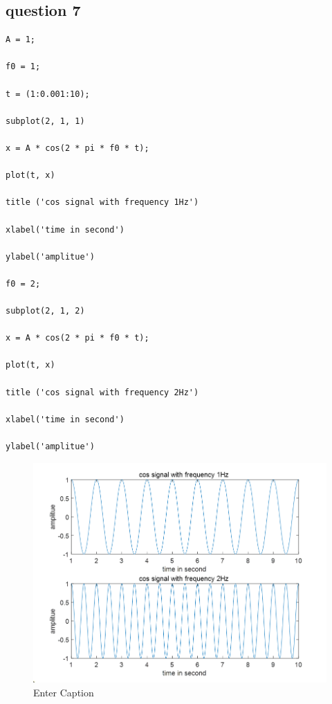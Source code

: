 \documentclass{article}
\begin{document}
\subsection{question 7}
\begin{lstlisting}
A = 1;

f0 = 1;

t = (1:0.001:10);

subplot(2, 1, 1)

x = A * cos(2 * pi * f0 * t);

plot(t, x)

title ('cos signal with frequency 1Hz')

xlabel('time in second')

ylabel('amplitue')

f0 = 2;

subplot(2, 1, 2)

x = A * cos(2 * pi * f0 * t);

plot(t, x)

title ('cos signal with frequency 2Hz')

xlabel('time in second')

ylabel('amplitue')
\end{lstlisting}
\begin{figure}[H]
    \centering
    \includegraphics[width=1\linewidth]{7.png}
    \caption{Enter Caption}
    \label{fig:7}
\end{figure}
\end{document}
